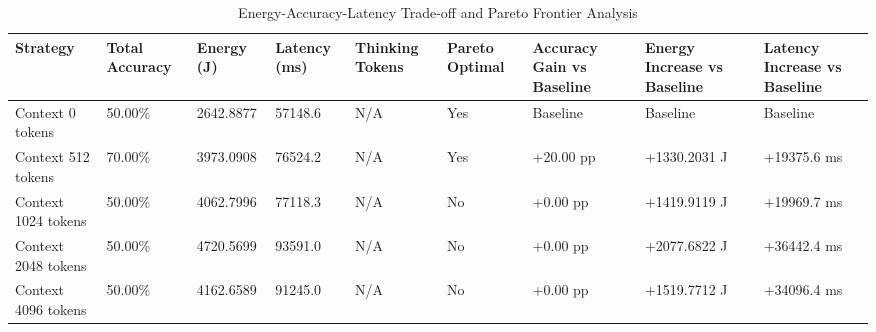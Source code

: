 \begin{table}
\caption{Energy-Accuracy-Latency Trade-off and Pareto Frontier Analysis}
\label{tab:tradeoff_comparison}
\begin{tabular}{lllllllll}
\toprule
Strategy & Total Accuracy & Energy (J) & Latency (ms) & Thinking Tokens & Pareto Optimal & Accuracy Gain vs Baseline & Energy Increase vs Baseline & Latency Increase vs Baseline \\
\midrule
Context 0 tokens & 50.00\% & 2642.8877 & 57148.6 & N/A & Yes & Baseline & Baseline & Baseline \\
Context 512 tokens & 70.00\% & 3973.0908 & 76524.2 & N/A & Yes & +20.00 pp & +1330.2031 J & +19375.6 ms \\
Context 1024 tokens & 50.00\% & 4062.7996 & 77118.3 & N/A & No & +0.00 pp & +1419.9119 J & +19969.7 ms \\
Context 2048 tokens & 50.00\% & 4720.5699 & 93591.0 & N/A & No & +0.00 pp & +2077.6822 J & +36442.4 ms \\
Context 4096 tokens & 50.00\% & 4162.6589 & 91245.0 & N/A & No & +0.00 pp & +1519.7712 J & +34096.4 ms \\
\bottomrule
\end{tabular}
\end{table}
